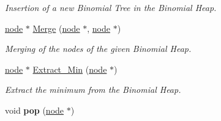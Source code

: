 \begin{DoxyCompactItemize}
\begin{DoxyCompactList}\small\item\em Insertion of a new Binomial Tree in the Binomial Heap. \end{DoxyCompactList}\item 
\hyperlink{structnode}{node} $\ast$ \hyperlink{classBinomialHeap_ade996e0273f3fcfa92b4dcce69ed111b}{Merge} (\hyperlink{structnode}{node} $\ast$, \hyperlink{structnode}{node} $\ast$)
\begin{DoxyCompactList}\small\item\em Merging of the nodes of the given Binomial Heap. \end{DoxyCompactList}\item 
\hyperlink{structnode}{node} $\ast$ \hyperlink{classBinomialHeap_a71e1468e2782db3f2322d188bca1e48a}{Extract\+\_\+\+Min} (\hyperlink{structnode}{node} $\ast$)
\begin{DoxyCompactList}\small\item\em Extract the minimum from the Binomial Heap. \end{DoxyCompactList}\item 
void {\bfseries pop} (\hyperlink{structnode}{node} $\ast$)\hypertarget{classBinomialHeap_ac44cc9f1ec94c2150a71b3ffead9c49a}{}\label{classBinomialHeap_ac44cc9f1ec94c2150a71b3ffead9c49a}


\end{DoxyCompactItemize}
